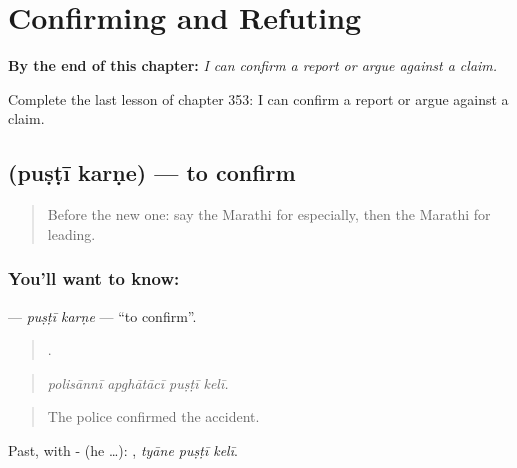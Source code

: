 
\chapter{Confirming and Refuting}
\label{ch:mr-confirming-and-refuting}

\begin{chapteropening}
\textbf{By the end of this chapter:} \emph{I can confirm a report or argue against a claim.}

Complete the last lesson of chapter 353: I can confirm a report or argue against a claim.
\end{chapteropening}

\section[\texorpdfstring{\mr{पुष्टी} \mr{करणे} (puṣṭī karṇe)}{पुष्टी करणे (puṣṭī karṇe)}]{  (puṣṭī karṇe) — to confirm}

\label{lesson:MR-C353-pusti-karne}



\begin{quote}
Before the new one: say the Marathi for especially, then the Marathi for leading.
\end{quote}

\subsection*{You'll want to know:  }
\textbf{ } — \emph{puṣṭī karṇe} — \textquotedblleft{}to confirm\textquotedblright{}.

\begin{quote}
   .
\end{quote}

\begin{quote}
\emph{polisānnī apghātācī puṣṭī kelī.}
\end{quote}

\begin{quote}
The police confirmed the accident.
\end{quote}

Past, with - (he …):   , \emph{tyāne puṣṭī kelī}.

